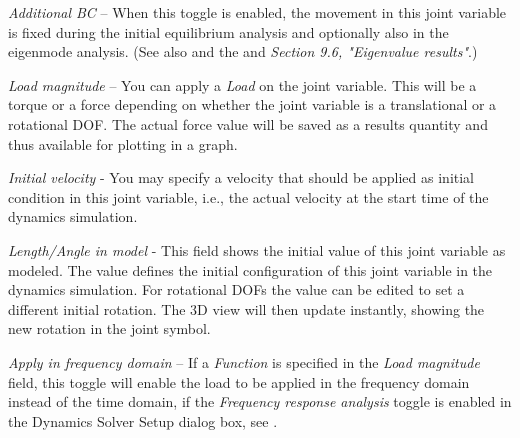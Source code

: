 \begin{bulletlist}
\item{\sl Additional BC} --
  When this toggle is enabled, the movement in this joint variable is fixed
  during the initial equilibrium analysis and optionally also in the eigenmode
  analysis. (See also
  and the 
  and {\sl Section 9.6, "Eigenvalue results"}.)

\item{\sl Load magnitude} --
  You can apply a {\sl Load} on the joint variable.
  This will be a torque or a force depending on whether the joint variable
  is a translational or a rotational DOF. The actual force value will be saved
  as a results quantity and thus available for plotting in a graph.

\item
  {\sl Initial velocity} - You may specify a velocity that should be
  applied as initial condition in this joint variable, i.e., the actual
  velocity at the start time of the dynamics simulation.

\item
  {\sl Length/Angle in model} - This field shows the initial value of
  this joint variable as modeled. The value defines the initial
  configuration of this joint variable in the dynamics simulation. For
  rotational DOFs the value can be edited to set a different initial rotation.
  The 3D view will then update instantly, showing the new rotation in the joint
  symbol.
\item
  {\sl Apply in frequency domain} -- If a {\sl Function} is specified
  in the {\sl Load magnitude} field, this toggle will enable the load
  to be applied in the frequency domain instead of the time domain,
  if the {\sl Frequency response analysis} toggle is enabled in the
  Dynamics Solver Setup dialog box,
  see .
\end{bulletlist}

